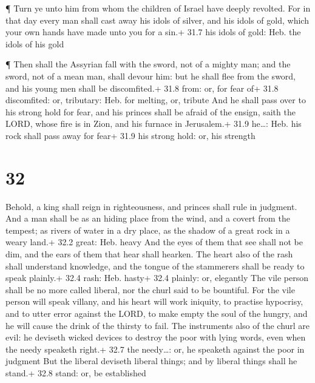  ¶ Turn ye unto him from whom the children of Israel have
deeply revolted.  For in that day every man shall cast away
his idols of silver, and his idols of gold, which your own hands have
made unto you for a sin.+ 31.7 his idols of gold: Heb. the idols of his
gold

 ¶ Then shall the Assyrian fall with the sword, not of a
mighty man; and the sword, not of a mean man, shall devour him: but he
shall flee from the sword, and his young men shall be discomfited.+ 31.8
from: or, for fear of+ 31.8 discomfited: or, tributary: Heb. for
melting, or, tribute  And he shall pass over to his strong
hold for fear, and his princes shall be afraid of the ensign, saith the
LORD, whose fire is in Zion, and his furnace in Jerusalem.+ 31.9
he\ldots: Heb. his rock shall pass away for fear+ 31.9 his strong hold:
or, his strength

\hypertarget{section-31}{%
\section{32}\label{section-31}}

 Behold, a king shall reign in righteousness, and princes
shall rule in judgment.  And a man shall be as an hiding
place from the wind, and a covert from the tempest; as rivers of water
in a dry place, as the shadow of a great rock in a weary land.+ 32.2
great: Heb. heavy  And the eyes of them that see shall not
be dim, and the ears of them that hear shall hearken.  The
heart also of the rash shall understand knowledge, and the tongue of the
stammerers shall be ready to speak plainly.+ 32.4 rash: Heb. hasty+ 32.4
plainly: or, elegantly  The vile person shall be no more
called liberal, nor the churl said to be bountiful.  For the
vile person will speak villany, and his heart will work iniquity, to
practise hypocrisy, and to utter error against the LORD, to make empty
the soul of the hungry, and he will cause the drink of the thirsty to
fail.  The instruments also of the churl are evil: he
deviseth wicked devices to destroy the poor with lying words, even when
the needy speaketh right.+ 32.7 the needy\ldots: or, he speaketh against
the poor in judgment  But the liberal deviseth liberal
things; and by liberal things shall he stand.+ 32.8 stand: or, be
established

